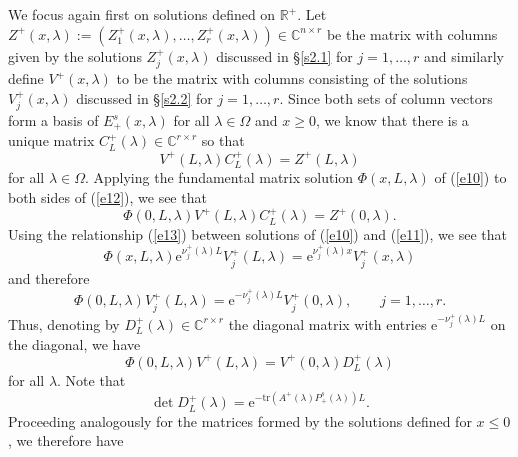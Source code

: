 \documentclass[10pt]{article}
\numberwithin{equation}{section}
\newcommand{\C}{\mathbb{C}}
\newcommand{\R}{\mathbb{R}}
\newcommand{\rme}{\mathrm{e}}
\begin{document}
We focus again first on solutions defined on $\R^+$. Let $Z^+(x,\lambda):=(Z^+_1(x,\lambda),\ldots,Z^+_r(x,\lambda))\in\C^{n\times r}$ be the matrix with columns given by the solutions $Z^+_j(x,\lambda)$ discussed in \S\ref{s2.1} for $j=1,\ldots,r$ and similarly define $V^+(x,\lambda)$ to be the matrix with columns consisting of the solutions $V^+_j(x,\lambda)$ discussed in \S\ref{s2.2} for $j=1,\ldots,r$. Since both sets of column vectors form a basis of $E^s_+(x,\lambda)$ for all $\lambda\in\Omega$ and $x\geq0$, we know that there is a unique matrix $C^+_L(\lambda)\in\C^{r\times r}$ so that
\begin{equation}\label{e12}
V^+(L,\lambda) C^+_L(\lambda) = Z^+(L,\lambda)
\end{equation}
for all $\lambda\in\Omega$. Applying the fundamental matrix solution $\Phi(x,L,\lambda)$ of (\ref{e10}) to both sides of (\ref{e12}), we see that
\begin{equation}\label{n1}
\Phi(0,L,\lambda) V^+(L,\lambda) C^+_L(\lambda) = Z^+(0,\lambda).
\end{equation}
Using the relationship (\ref{e13}) between solutions of (\ref{e10}) and (\ref{e11}), we see that
\[
\Phi(x,L,\lambda) \rme^{\nu^+_j(\lambda)L} V^+_j(L,\lambda) = \rme^{\nu^+_j(\lambda)x} V^+_j(x,\lambda)
\]
and therefore
\[
\Phi(0,L,\lambda)V^+_j(L,\lambda) = \rme^{-\nu^+_j(\lambda)L} V^+_j(0,\lambda), \qquad j=1,\ldots,r.
\]
Thus, denoting by $D^+_L(\lambda)\in\C^{r\times r}$ the diagonal matrix with entries $\rme^{-\nu^+_j(\lambda)L}$ on the diagonal, we have
\begin{equation}\label{e62}
\Phi(0,L,\lambda) V^+(L,\lambda) = V^+(0,\lambda) D^+_L(\lambda)
\end{equation}
for all $\lambda$. Note that
\begin{equation}\label{n2}
\det D^+_L(\lambda) = \rme^{-\mathrm{tr}(A^+(\lambda)P^s_+(\lambda))L}.
\end{equation}
Proceeding analogously for the matrices formed by the solutions defined for $x\leq0$, we therefore have
\end{document}
